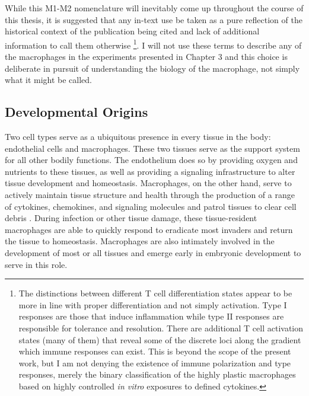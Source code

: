 While this M1\hyp{}M2 nomenclature will inevitably come up throughout the course of this thesis, it is suggested that any in\hyp{}text use be taken as a pure reflection of the historical context of the publication being cited and lack of additional information to call them otherwise \footnote{The distinctions between different T cell differentiation states appear to be more in line with proper differentiation and not simply activation. Type I responses are those that induce inflammation while type II responses are responsible for tolerance and resolution. There are additional T cell activation states (many of them) that reveal some of the discrete loci along the gradient which immune responses can exist. This is beyond the scope of the present work, but I am not denying the existence of immune polarization and type responses, merely the binary classification of the highly plastic macrophages based on highly controlled \textit{in vitro} exposures to defined cytokines.}. I will not use these terms to describe any of the macrophages in the experiments presented in Chapter 3 and this choice is deliberate in pursuit of understanding the biology of the macrophage, not simply what it might be called.

\subsection{Developmental Origins}\label{macdev}

Two cell types serve as a ubiquitous presence in every tissue in the body: endothelial cells and macrophages. These two tissues serve as the support system for all other bodily functions. The endothelium does so by providing oxygen and nutrients to these tissues, as well as providing a signaling infrastructure to alter tissue development and homeostasis. Macrophages, on the other hand, serve to actively maintain tissue structure and health through the production of a range of cytokines, chemokines, and signaling molecules and patrol tissues to clear cell debris \citep{Wynn2013}. During infection or other tissue damage, these tissue\hyp{}resident macrophages are able to quickly respond to eradicate most invaders and return the tissue to homeostasis. Macrophages are also intimately involved in the development of most or all tissues and emerge early in embryonic development to serve in this role.

